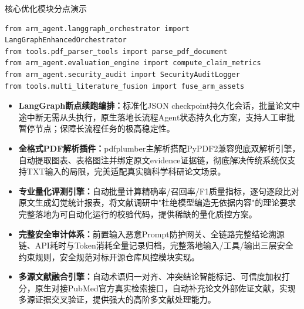 ﻿\documentclass[UTF8,aspectratio=169]{ctexbeamer}
\begin{document}
\begin{frame}[fragile]{核心优化模块分点演示}
\begin{lstlisting}
from arm_agent.langgraph_orchestrator import LangGraphEnhancedOrchestrator
from tools.pdf_parser_tools import parse_pdf_document
from arm_agent.evaluation_engine import compute_claim_metrics
from arm_agent.security_audit import SecurityAuditLogger
from tools.multi_literature_fusion import fuse_arm_assets
\end{lstlisting}
  \begin{itemize}
    \item \textbf{LangGraph断点续跑编排：}标准化JSON checkpoint持久化会话，批量论文中途中断无需从头执行，原生落地长流程Agent状态持久化方案，支持人工审批暂停节点；保障长流程任务的极高稳定性。
    \item \textbf{全格式PDF解析插件：}pdfplumber主解析搭配PyPDF2兼容兜底双解析引擎，自动提取图表、表格图注并绑定原文evidence证据链，彻底解决传统系统仅支持TXT输入的局限，完美适配真实脑科学科研论文场景。
    \item \textbf{专业量化评测引擎：}自动批量计算精确率/召回率/F1质量指标，逐句逐段比对原文生成幻觉统计报表，将文献调研中"杜绝模型编造无依据内容"的理论要求完整落地为可自动化运行的校验代码，提供稀缺的量化质控方案。
    \item \textbf{完整安全审计体系：}前置输入恶意Prompt防护网关、全链路完整结论溯源链、API耗时与Token消耗全量记录归档，完整落地输入/工具/输出三层安全约束规则，安全规范对标开源仓库风控模块实现。
    \item \textbf{多源文献融合引擎：}自动术语归一对齐、冲突结论智能标记、可信度加权打分，原生对接PubMed官方真实检索接口，自动补充论文外部佐证文献，实现多源证据交叉验证，提供强大的高阶多文献处理能力。
  \end{itemize}
\end{frame}
\end{document}
